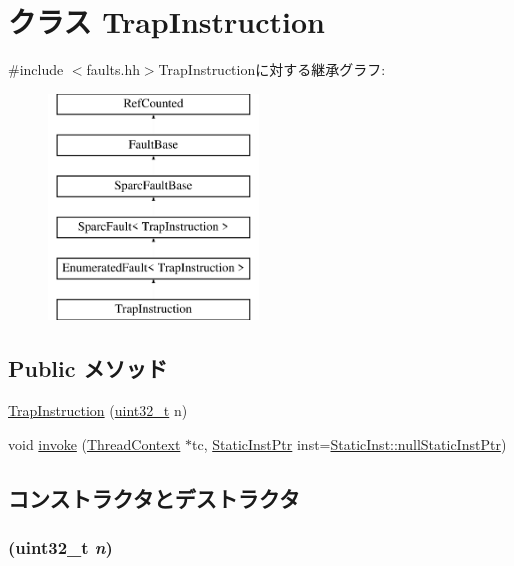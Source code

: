\hypertarget{classSparcISA_1_1TrapInstruction}{
\section{クラス TrapInstruction}
\label{classSparcISA_1_1TrapInstruction}
}


{\ttfamily \#include $<$faults.hh$>$}TrapInstructionに対する継承グラフ:\begin{figure}[H]
\begin{center}
\leavevmode
\includegraphics[height=6cm]{classSparcISA_1_1TrapInstruction}
\end{center}
\end{figure}
\subsection*{Public メソッド}
\begin{DoxyCompactItemize}
\item 
\hyperlink{classSparcISA_1_1TrapInstruction_ab286cf015a822542e50d90589bcc6884}{TrapInstruction} (\hyperlink{Type_8hh_a435d1572bf3f880d55459d9805097f62}{uint32\_\-t} n)
\item 
void \hyperlink{classSparcISA_1_1TrapInstruction_a2bd783b42262278d41157d428e1f8d6f}{invoke} (\hyperlink{classThreadContext}{ThreadContext} $\ast$tc, \hyperlink{classRefCountingPtr}{StaticInstPtr} inst=\hyperlink{classStaticInst_aa793d9793af735f09096369fb17567b6}{StaticInst::nullStaticInstPtr})
\end{DoxyCompactItemize}


\subsection{コンストラクタとデストラクタ}
\hypertarget{classSparcISA_1_1TrapInstruction_ab286cf015a822542e50d90589bcc6884}{
\subsubsection[{TrapInstruction}]{ ({\bf uint32\_\-t} {\em n})}}
\label{classSparcISA_1_1TrapInstruction_ab286cf015a822542e50d90589bcc6884}



